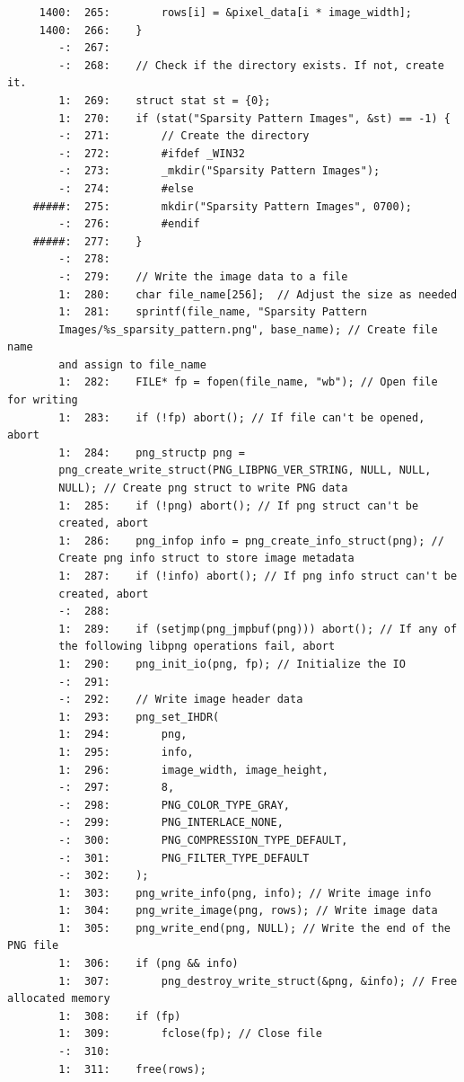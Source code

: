 \documentclass[12pt]{article}
\begin{document}
\begin{mdframed}[style=myboxstyleTerminal1]
\begin{verbatim}
     1400:  265:        rows[i] = &pixel_data[i * image_width];
     1400:  266:    }
        -:  267:
        -:  268:    // Check if the directory exists. If not, create it.
        1:  269:    struct stat st = {0};
        1:  270:    if (stat("Sparsity Pattern Images", &st) == -1) {
        -:  271:        // Create the directory
        -:  272:        #ifdef _WIN32
        -:  273:        _mkdir("Sparsity Pattern Images");
        -:  274:        #else
    #####:  275:        mkdir("Sparsity Pattern Images", 0700);
        -:  276:        #endif
    #####:  277:    }
        -:  278:
        -:  279:    // Write the image data to a file
        1:  280:    char file_name[256];  // Adjust the size as needed
        1:  281:    sprintf(file_name, "Sparsity Pattern 
        Images/%s_sparsity_pattern.png", base_name); // Create file name 
        and assign to file_name
        1:  282:    FILE* fp = fopen(file_name, "wb"); // Open file for writing
        1:  283:    if (!fp) abort(); // If file can't be opened, abort
        1:  284:    png_structp png = 
        png_create_write_struct(PNG_LIBPNG_VER_STRING, NULL, NULL, 
        NULL); // Create png struct to write PNG data
        1:  285:    if (!png) abort(); // If png struct can't be 
        created, abort
        1:  286:    png_infop info = png_create_info_struct(png); // 
        Create png info struct to store image metadata
        1:  287:    if (!info) abort(); // If png info struct can't be 
        created, abort
        -:  288:
        1:  289:    if (setjmp(png_jmpbuf(png))) abort(); // If any of 
        the following libpng operations fail, abort 
        1:  290:    png_init_io(png, fp); // Initialize the IO
        -:  291:
        -:  292:    // Write image header data
        1:  293:    png_set_IHDR(
        1:  294:        png,
        1:  295:        info,
        1:  296:        image_width, image_height,
        -:  297:        8,
        -:  298:        PNG_COLOR_TYPE_GRAY,
        -:  299:        PNG_INTERLACE_NONE,
        -:  300:        PNG_COMPRESSION_TYPE_DEFAULT,
        -:  301:        PNG_FILTER_TYPE_DEFAULT
        -:  302:    );
        1:  303:    png_write_info(png, info); // Write image info
        1:  304:    png_write_image(png, rows); // Write image data
        1:  305:    png_write_end(png, NULL); // Write the end of the PNG file
        1:  306:    if (png && info)
        1:  307:        png_destroy_write_struct(&png, &info); // Free allocated memory
        1:  308:    if (fp)
        1:  309:        fclose(fp); // Close file
        -:  310:
        1:  311:    free(rows);

\end{verbatim}
\end{mdframed}
\end{document}
